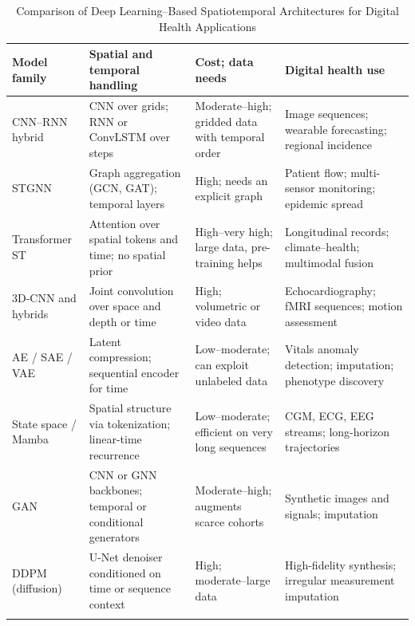\documentclass[journal]{IEEEtran}
\newif\ifsubmission
\begin{document}
\ifsubmission\else
\begin{table}[htbp]
\centering
\caption{Comparison of Deep Learning--Based Spatiotemporal Architectures for Digital Health Applications}
\label{tab:st-model-comparison}
\ifsubmission
\scriptsize
\setlength{\tabcolsep}{4pt}
\renewcommand{\arraystretch}{1.05}
\begin{tabularx}{\textwidth}{>{\raggedright\arraybackslash}p{2.4cm} >{\raggedright\arraybackslash}X >{\raggedright\arraybackslash}p{4.0cm} >{\raggedright\arraybackslash}X}
\toprule
\textbf{Model family} & \textbf{Spatial and temporal handling} & \textbf{Cost; data needs} & \textbf{Digital health use} \\
\midrule
CNN--RNN hybrid & CNN over grids; RNN or ConvLSTM over steps & Moderate--high; gridded data with temporal order & Image sequences; wearable forecasting; regional incidence \\
\addlinespace[2pt]
\rowcolor{tablestripe}STGNN & Graph aggregation (GCN, GAT); temporal layers & High; needs an explicit graph & Patient flow; multi-sensor monitoring; epidemic spread \\
\addlinespace[2pt]
Transformer ST & Attention over spatial tokens and time; no spatial prior & High--very high; large data, pre-training helps & Longitudinal records; climate--health; multimodal fusion \\
\addlinespace[2pt]
\rowcolor{tablestripe}3D-CNN and hybrids & Joint convolution over space and depth or time & High; volumetric or video data & Echocardiography; fMRI sequences; motion assessment \\
\addlinespace[2pt]
AE / SAE / VAE & Latent compression; sequential encoder for time & Low--moderate; can exploit unlabeled data & Vitals anomaly detection; imputation; phenotype discovery \\
\addlinespace[2pt]
\rowcolor{tablestripe}State space / Mamba & Spatial structure via tokenization; linear-time recurrence & Low--moderate; efficient on very long sequences & CGM, ECG, EEG streams; long-horizon trajectories \\
\addlinespace[2pt]
GAN & CNN or GNN backbones; temporal or conditional generators & Moderate--high; augments scarce cohorts & Synthetic images and signals; imputation \\
\addlinespace[2pt]
\rowcolor{tablestripe}DDPM (diffusion) & U-Net denoiser conditioned on time or sequence context & High; moderate--large data & High-fidelity synthesis; irregular measurement imputation \\
\addlinespace[2pt]

\end{tabularx}
\end{table}
\end{document}
